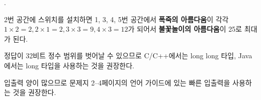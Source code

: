 \begin{problem}{\probno{}. \probtitle{}}
\Example

\begin{example}
\end{example}

2번 공간에 스위치를 설치하면 1, 3, 4, 5번 공간에서 \textbf{폭죽의 아름다움}이 각각 $1 \times 2 = 2, 2 \times 1 = 2, 3 \times 3 = 9, 4 \times 3 = 12$가 되어서 \textbf{불꽃놀이의 아름다움}이 25로 최대가 된다.



\Notes
정답이 32비트 정수 범위를 벗어날 수 있으므로 C/C++에서는 long long 타입, Java에서는 long 타입을 사용하는 것을 권장한다.

입출력 양이 많으므로 문제지 2--4페이지의 언어 가이드에 있는 빠른 입출력을 사용하는 것을 권장한다.

\end{problem}